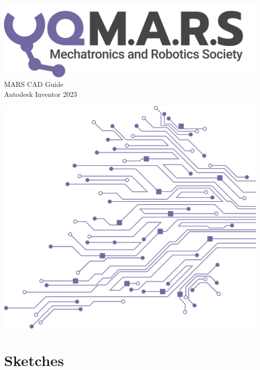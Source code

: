 \documentclass[a4paper,12pt]{report}
\begin{document}
\begin{titlepage}
    \begin{center}
        \vspace*{15mm}
        \includegraphics[width=0.7\paperwidth]{./assets/Logo (Dark).png} \\
        \vspace{1cm}
        \Huge MARS CAD Guide \\
        \huge \textcolor{turbo_purple}{Autodesk Inventor 2023}
    \end{center}
    \vfill
    \includegraphics[height=0.5\paperheight, right]{./assets/Pattern - PCB (Solid).png}
    \vspace*{10mm}
\end{titlepage}
\restoregeometry
\newpage
\tableofcontents

\section{Sketches}
\end{document}
